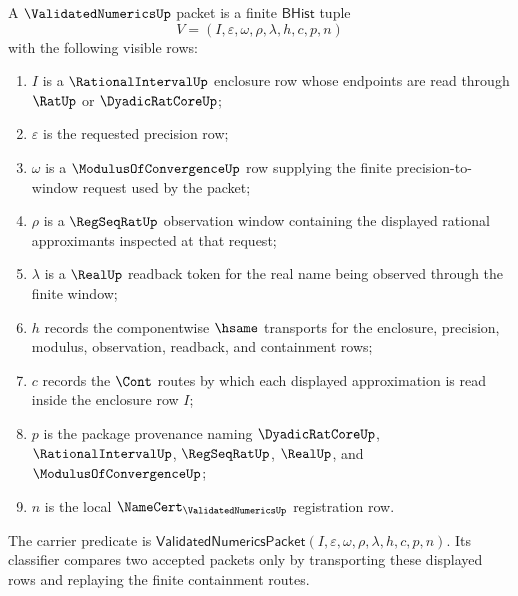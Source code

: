 \begin{definition}
\label{def:validatednumerics-bhist-source}
A $\ValidatedNumericsUp$ packet is a finite $\mathsf{BHist}$ tuple
$$
V=(I,\varepsilon,\omega,\rho,\lambda,h,c,p,n)
$$
with the following visible rows:
\begin{enumerate}
\item $I$ is a $\RationalIntervalUp$ enclosure row whose endpoints are read
  through $\RatUp$ or $\DyadicRatCoreUp$;
\item $\varepsilon$ is the requested precision row;
\item $\omega$ is a $\ModulusOfConvergenceUp$ row supplying the finite
  precision-to-window request used by the packet;
\item $\rho$ is a $\RegSeqRatUp$ observation window containing the displayed
  rational approximants inspected at that request;
\item $\lambda$ is a $\RealUp$ readback token for the real name being
  observed through the finite window;
\item $h$ records the componentwise $\hsame$ transports for the enclosure,
  precision, modulus, observation, readback, and containment rows;
\item $c$ records the $\Cont$ routes by which each displayed approximation is
  read inside the enclosure row $I$;
\item $p$ is the package provenance naming $\DyadicRatCoreUp$,
  $\RationalIntervalUp$, $\RegSeqRatUp$, $\RealUp$, and
  $\ModulusOfConvergenceUp$;
\item $n$ is the local $\NameCert_{\ValidatedNumericsUp}$ registration row.
\end{enumerate}
The carrier predicate is
$\mathsf{ValidatedNumericsPacket}(I,\varepsilon,\omega,\rho,\lambda,h,c,p,n)$.
Its classifier compares two accepted packets only by transporting these
displayed rows and replaying the finite containment routes.
\end{definition}

